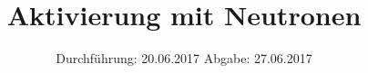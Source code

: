 

\subject{V702}
\title{Aktivierung mit Neutronen}
\date{
\centering
  Durchführung: 20.06.2017
  \hspace{3em}
  Abgabe: 27.06.2017
}



\maketitle
\thispagestyle{empty}
\tableofcontents
\newpage



%





\printbibliography
\newpage


